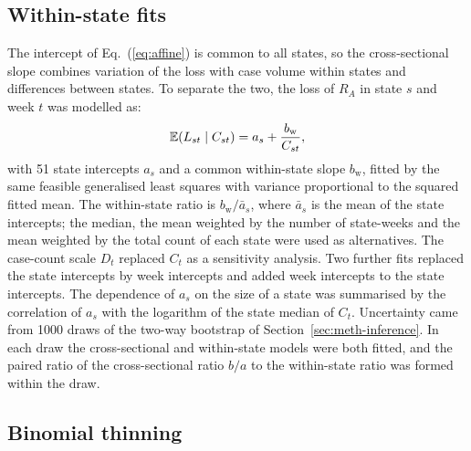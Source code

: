 \subsection{Within-state fits}
\label{sec:meth-fe}

The intercept of Eq.~(\ref{eq:affine}) is common to all states, so the cross-sectional slope combines variation of the loss with case volume within states and differences between states. To separate the two, the loss of $R_A$ in state $s$ and week $t$ was modelled as:
\begin{equation}
  \mathbb{E}(L_{st}\mid C_{st})=a_s+\frac{b_{\mathrm{w}}}{C_{st}},
  \label{eq:fe}
\end{equation}
with 51 state intercepts $a_s$ and a common within-state slope $b_{\mathrm{w}}$, fitted by the same feasible generalised least squares with variance proportional to the squared fitted mean. The within-state ratio is $b_{\mathrm{w}}/\bar{a}_s$, where $\bar{a}_s$ is the mean of the state intercepts; the median, the mean weighted by the number of state-weeks and the mean weighted by the total count of each state were used as alternatives. The case-count scale $D_t$ replaced $C_t$ as a sensitivity analysis. Two further fits replaced the state intercepts by week intercepts and added week intercepts to the state intercepts. The dependence of $a_s$ on the size of a state was summarised by the correlation of $a_s$ with the logarithm of the state median of $C_t$. Uncertainty came from 1000 draws of the two-way bootstrap of Section~\ref{sec:meth-inference}. In each draw the cross-sectional and within-state models were both fitted, and the paired ratio of the cross-sectional ratio $b/a$ to the within-state ratio was formed within the draw.

\subsection{Binomial thinning}
\label{sec:meth-thinning}

